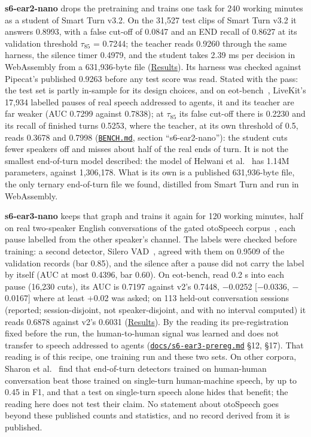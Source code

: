 \documentclass[10pt]{article}
\begin{document}
\textbf{s6-ear2-nano} drops the pretraining and trains one task for 240 working minutes as a student of Smart Turn v3.2. On the 31,527 test clips of Smart Turn v3.2 it answers 0.8993, with a false cut-off of 0.0847 and an END recall of 0.8627 at its validation threshold $\tau_{85}$ = 0.7244; the teacher reads 0.9260 through the same harness, the silence timer 0.4979, and the student takes 2.39 ms per decision in WebAssembly from a 631,936-byte file (\href{https://maxgfr.github.io/skycmd/results/\#s6-ear2-nano-passed}{Results}). Its harness was checked against Pipecat's published 0.9263 before any test score was read. Stated with the pass: the test set is partly in-sample for its design choices, and on eot-bench~\cite{eotbench}, LiveKit's 17,934 labelled pauses of real speech addressed to agents, it and its teacher are far weaker (AUC 0.7299 against 0.7838); at $\tau_{85}$ its false cut-off there is 0.2230 and its recall of finished turns 0.5253, where the teacher, at its own threshold of 0.5, reads 0.3678 and 0.7998 (\href{https://github.com/maxgfr/skycmd/blob/main/BENCH.md}{\texttt{BENCH.md}}, section ``s6-ear2-nano''): the student cuts fewer speakers off and misses about half of the real ends of turn. It is not the smallest end-of-turn model described: the model of Helwani et al.~\cite{helwani2026eot} has 1.14M parameters, against 1,306,178. What is its own is a published 631,936-byte file, the only ternary end-of-turn file we found, distilled from Smart Turn and run in WebAssembly.

\textbf{s6-ear3-nano} keeps that graph and trains it again for 120 working minutes, half on real two-speaker English conversations of the gated otoSpeech corpus~\cite{otospeech}, each pause labelled from the other speaker's channel. The labels were checked before training: a second detector, Silero VAD~\cite{silerovad}, agreed with them on 0.9509 of the validation records (bar 0.85), and the silence after a pause did not carry the label by itself (AUC at most 0.4396, bar 0.60). On eot-bench, read 0.2 s into each pause (16,230 cuts), its AUC is 0.7197 against v2's 0.7448, $-$0.0252 [$-$0.0336, $-$0.0167] where at least +0.02 was asked; on 113 held-out conversation sessions (reported; session-disjoint, not speaker-disjoint, and with no interval computed) it reads 0.6878 against v2's 0.6031 (\href{https://maxgfr.github.io/skycmd/results/\#s6-ear3-nano-failed}{Results}). By the reading its pre-registration fixed before the run, the human-to-human signal was learned and does not transfer to speech addressed to agents (\href{https://github.com/maxgfr/skycmd/blob/main/docs/s6-ear3-prereg.md}{\texttt{docs/\allowbreak{}s6-ear3-prereg.md}} \S{}12, \S{}17). That reading is of this recipe, one training run and these two sets. On other corpora, Sharon et al.~\cite{sharon2026genre} find that end-of-turn detectors trained on human-human conversation beat those trained on single-turn human-machine speech, by up to 0.45 in F1, and that a test on single-turn speech alone hides that benefit; the reading here does not test their claim. No statement about otoSpeech goes beyond these published counts and statistics, and no record derived from it is published.
\end{document}
